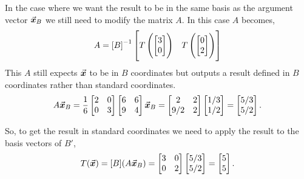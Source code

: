 \documentclass[../MathsNotesBase.tex]{subfiles}
\begin{document}
{\begin{exe}
{				In the case where we want the result to be in the same basis as the argument vector $\vec{\bm{x}}_B$ we still need to modify the matrix $A$. In this case $A$ becomes,
				\[ A = {[B]}^{-1}\begin{bmatrix}
						T\left(\begin{bmatrix}3 \\ 0\end{bmatrix}\right) & T\left(\begin{bmatrix}0 \\ 2\end{bmatrix}\right)
						\end{bmatrix}
				\]
				This $A$ still expects $\vec{\bm{x}}$ to be in $B$ coordinates but outputs a result defined in $B$ coordinates rather than standard coordinates.
				\[ A\vec{\bm{x}}_B = \frac{1}{6}\begin{bmatrix}
							2 & 0\\
							0 & 3
							\end{bmatrix}
							\begin{bmatrix}
							6 & 6\\
							9 & 4
							\end{bmatrix}
							\vec{\bm{x}}_B =
							\begin{bmatrix}
							2 & 2\\
							9/2 & 2
							\end{bmatrix}
							\begin{bmatrix}
							1/3\\
							1/2
							\end{bmatrix} =
							\begin{bmatrix}
							5/3\\
							5/2
							\end{bmatrix}.
				\]
				
				So, to get the result in standard coordinates we need to apply the result to the basis vectors of $B'$,
				\[ T(\vec{\bm{x}}) = [B](A\vec{\bm{x}}_B) =
							\begin{bmatrix}
							3 & 0\\
							0 & 2
							\end{bmatrix}
				 			\begin{bmatrix}
				 			5/3\\
				 			5/2
				 			\end{bmatrix} =
				 			\begin{bmatrix}
				 			5\\
				 			5
				 			\end{bmatrix}.
				\]
			}
		\end{exe}
	
}
\end{document}
